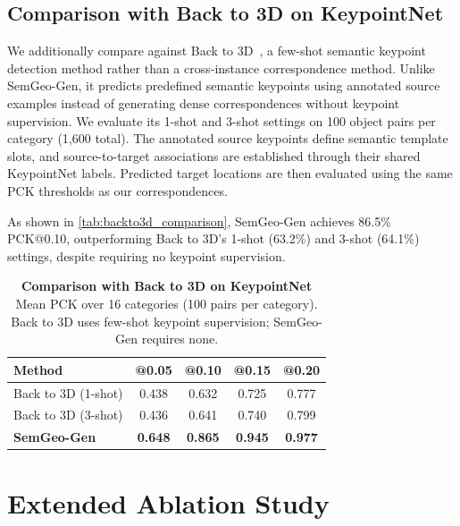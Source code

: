 \subsection{Comparison with Back to 3D on KeypointNet}
\label{sup:backto3d}

We additionally compare against Back to 3D~\cite{wimmer2024back},
a few-shot semantic keypoint detection method rather than a
cross-instance correspondence method. Unlike SemGeo-Gen, it
predicts predefined semantic keypoints using annotated source
examples instead of generating dense correspondences without
keypoint supervision. We evaluate its 1-shot and 3-shot settings
on 100 object pairs per category (1,600 total).
The annotated source keypoints define semantic template slots,
and source-to-target associations are established through their
shared KeypointNet labels. Predicted target locations are then
evaluated using the same PCK thresholds as our correspondences.

As shown in \autoref{tab:backto3d_comparison},
SemGeo-Gen achieves 86.5\% PCK@0.10, outperforming
Back to 3D's 1-shot (63.2\%) and 3-shot (64.1\%)
settings, despite requiring no keypoint supervision.

\begin{table}[h]
\centering
\small
\setlength{\tabcolsep}{4pt}
\caption{\textbf{Comparison with Back to 3D \cite{wimmer2024back} on KeypointNet \cite{you2020}}
Mean PCK over 16 categories (100 pairs per category).
Back to 3D uses few-shot keypoint supervision;
SemGeo-Gen requires none.}
\label{tab:backto3d_comparison}
\vspace{4pt}
\begin{tabular}{lcccc}
\toprule
Method & @0.05 & @0.10 & @0.15 & @0.20 \\
\midrule
Back to 3D (1-shot) & 0.438 & 0.632 & 0.725 & 0.777 \\
Back to 3D (3-shot) & 0.436 & 0.641 & 0.740 & 0.799 \\
\textbf{SemGeo-Gen} & \textbf{0.648} & \textbf{0.865}
& \textbf{0.945} & \textbf{0.977} \\
\bottomrule
\end{tabular}
\end{table}


\clearpage

\section{Extended Ablation Study}
\label{sup:ablation_study}

